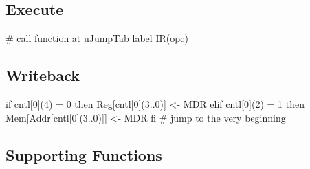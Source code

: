 \documentclass[12pt]{article}
\begin{document}
\subsection{Execute}
\begin{verbatimtab}
# call function at uJumpTab label IR(opc)
\end{verbatimtab}

\subsection{Writeback}
\begin{verbatimtab}
if cntl[0](4) = 0 then
	Reg[cntl[0](3..0)] <- MDR
elif cntl[0](2) = 1 then
	Mem[Addr[cntl[0](3..0)]] <- MDR
fi
# jump to the very beginning
\end{verbatimtab}

\subsection{Supporting Functions}
\end{document}

